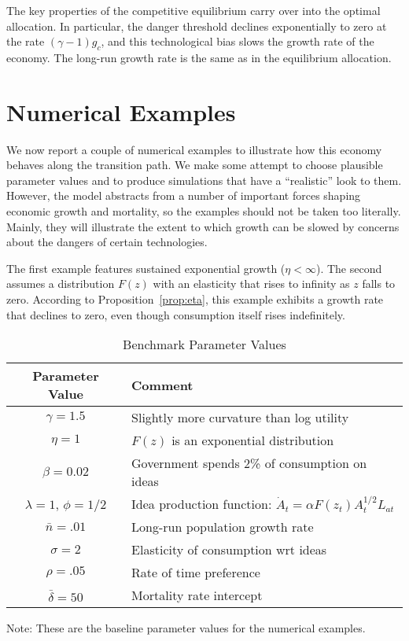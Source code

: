\documentclass[12pt,twoside]{article}
\newcommand{\tabnote}[2]{\begin{center}\parbox[c]{#1}{\footnotesize #2} \end{center}}
\begin{document}
The key properties of the competitive equilibrium carry over into the
optimal allocation.  In particular, the danger threshold declines
exponentially to zero at the rate $(\gamma-1) g_c$, and this
technological bias slows the growth rate of the economy.  The long-run
growth rate is the same as in the equilibrium allocation.


\section{Numerical Examples}

We now report a couple of numerical examples to illustrate how this
economy behaves along the transition path. We make some attempt to
choose plausible parameter values and to produce simulations that have a
``realistic'' look to them. However, the model abstracts from a number
of important forces shaping economic growth and mortality, so the
examples should not be taken too literally. Mainly, they will illustrate
the extent to which growth can be slowed by concerns about the dangers
of certain technologies.

The first example features sustained exponential growth ($\eta<\infty$).
The second assumes a distribution $F(z)$ with an elasticity that rises
to infinity as $z$ falls to zero. According to
Proposition~\ref{prop:eta}, this example exhibits a growth rate that
declines to zero, even though consumption itself rises indefinitely.

\begin{table}[tp]
\caption{Benchmark Parameter Values}
\label{tab:params} %
\begin{tabular*}{\textwidth}{@{\extracolsep{\fill}}cl} \hline
 Parameter Value & Comment   \\ \hline
$\gamma=1.5$ & Slightly more curvature than log utility \\
$\eta=1$ & $F(z)$ is an exponential distribution  \\
$\beta=0.02$ & Government spends 2\% of consumption on ideas  \\
$\lambda=1$, $\phi=1/2$ & Idea production function: $\dot{A}_t = \alpha F(z_t) A_t ^{1/2} L_{at}$  \\
$\bar{n}=.01$ & Long-run population growth rate   \\
$\sigma=2$ & Elasticity of consumption wrt ideas  \\
$\rho=.05$ & Rate of time preference   \\
$\bar\delta=50$ & Mortality rate intercept   \\
\hline
\end{tabular*}
\tabnote{5.5in}{Note: These are the baseline parameter values for the
  numerical examples.}  
\end{table}
\end{document}
